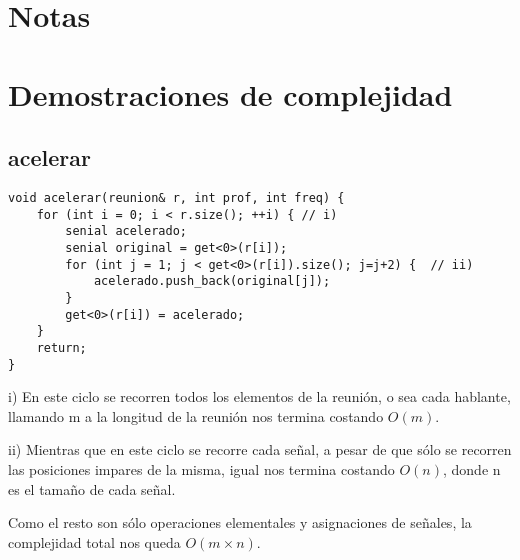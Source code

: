 \documentclass{article}
\begin{document}
\maketitle

\tableofcontents
\newpage



\section*{Notas}
\vspace{0.5cm}


\newpage
{}
\section*{Demostraciones de complejidad}
\vspace{0.5cm}
\subsection{acelerar}
\begin{lstlisting}
void acelerar(reunion& r, int prof, int freq) {
    for (int i = 0; i < r.size(); ++i) { // i)
        senial acelerado;
        senial original = get<0>(r[i]);
        for (int j = 1; j < get<0>(r[i]).size(); j=j+2) {  // ii)
            acelerado.push_back(original[j]);
        }
        get<0>(r[i]) = acelerado;
    }
    return; 
}
\end{lstlisting}
i) En este ciclo se recorren todos los elementos de la reunión, o sea cada hablante, llamando m a la longitud de la reunión nos termina costando $O(m)$.

ii) Mientras que en este ciclo se recorre cada señal, a pesar de que sólo se recorren las posiciones impares de la misma, igual nos termina costando $O(n)$, donde n es el tamaño de cada señal.

Como el resto son sólo operaciones elementales y asignaciones de señales, la complejidad total nos queda $O(m \times n)$.
\end{document}
